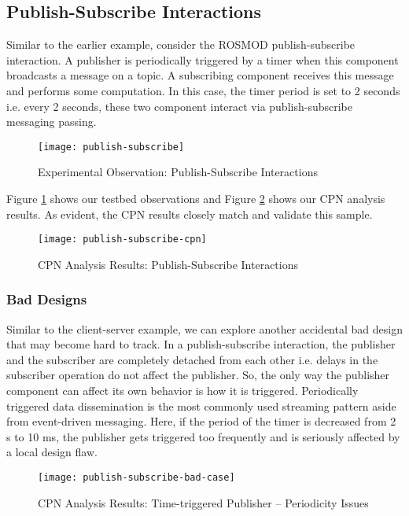 \subsection{Publish-Subscribe Interactions}

Similar to the earlier example, consider the ROSMOD publish-subscribe interaction. A publisher is periodically triggered by a timer when this component broadcasts a message on a topic. A subscribing component receives this message and performs some computation. In this case, the timer period is set to 2 seconds i.e. every 2 seconds, these two component interact via publish-subscribe messaging passing. 

\begin{figure}[h]
	\centering
	\texttt{[image: publish-subscribe]}
	\caption{Experimental Observation: Publish-Subscribe Interactions}
	\label{fig:publish-subscribe}
\end{figure}
\FloatBarrier

Figure \ref{fig:publish-subscribe} shows our testbed observations and Figure \ref{fig:publish-subscribe-cpn} shows our CPN analysis results. As evident, the CPN results closely match and validate this sample. 

\begin{figure}[h]
	\centering
	\texttt{[image: publish-subscribe-cpn]}
	\caption{CPN Analysis Results: Publish-Subscribe Interactions}
	\label{fig:publish-subscribe-cpn}
\end{figure}
\FloatBarrier

\subsubsection{Bad Designs}

Similar to the client-server example, we can explore another accidental bad design that may become hard to track. In a publish-subscribe interaction, the publisher and the subscriber are completely detached from each other i.e. delays in the subscriber operation do not affect the publisher. So, the only way the publisher component can affect its own behavior is how it is triggered. Periodically triggered data dissemination is the most commonly used streaming pattern aside from event-driven messaging. Here, if the period of the timer is decreased from 2 s to 10 ms, the publisher gets triggered too frequently and is seriously affected by a local design flaw.  

\begin{figure}[h]
	\centering
	\texttt{[image: publish-subscribe-bad-case]}
	\caption{CPN Analysis Results: Time-triggered Publisher -- Periodicity Issues}
	\label{fig:publish-subscribe-bad-case}
\end{figure}
\FloatBarrier


